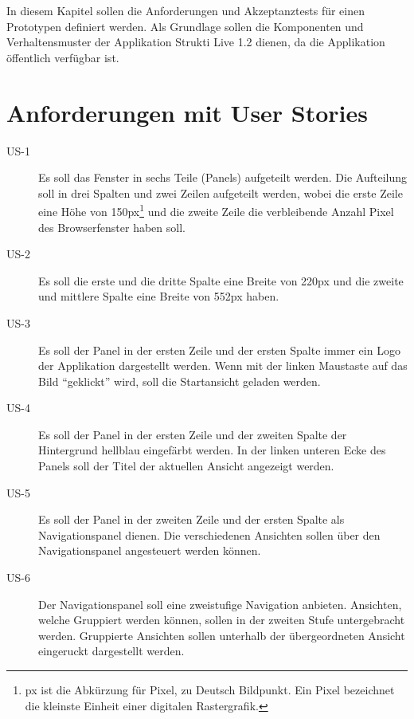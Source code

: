In diesem Kapitel sollen die Anforderungen und Akzeptanztests für einen
Prototypen definiert werden. Als Grundlage sollen die Komponenten und
Verhaltensmuster der Applikation Strukti Live 1.2 dienen, da die Applikation
öffentlich verfügbar ist.

\section{Anforderungen mit User Stories}

\begin{description}
\item[US-1\label{itm:US-1}]
Es soll das Fenster in sechs Teile (Panels) aufgeteilt werden. Die Aufteilung
soll in drei Spalten und zwei Zeilen aufgeteilt werden, wobei die erste Zeile
eine Höhe von 150px\footnote{px ist die Abkürzung für Pixel, zu Deutsch
Bildpunkt. Ein Pixel bezeichnet die kleinste Einheit einer digitalen
Rastergrafik.} und die zweite Zeile die verbleibende Anzahl Pixel des
Browserfenster haben soll.

\item[US-2\label{itm:US-2}]
Es soll die erste und die dritte Spalte eine Breite von 220px und die zweite
und mittlere Spalte eine Breite von 552px haben.

\item[US-3\label{itm:US-3}]
Es soll der Panel in der ersten Zeile und der ersten Spalte immer ein Logo der
Applikation dargestellt werden. Wenn mit der linken Maustaste auf das Bild
``geklickt'' wird, soll die Startansicht geladen werden.

\item[US-4\label{itm:US-4}]
Es soll der Panel in der ersten Zeile und der zweiten Spalte der Hintergrund
hellblau eingefärbt werden. In der linken unteren Ecke des Panels soll der Titel
der aktuellen Ansicht angezeigt werden.

\item[US-5\label{itm:US-5}]
Es soll der Panel in der zweiten Zeile und der ersten Spalte als
Navigationspanel dienen. Die verschiedenen Ansichten sollen über den
Navigationspanel angesteuert werden können.

\item[US-6\label{itm:US-6}]
Der Navigationspanel soll eine zweistufige Navigation anbieten. Ansichten,
welche Gruppiert werden können, sollen in der zweiten Stufe untergebracht
werden. Gruppierte Ansichten sollen unterhalb der übergeordneten Ansicht
eingeruckt dargestellt werden.


\end{description}

